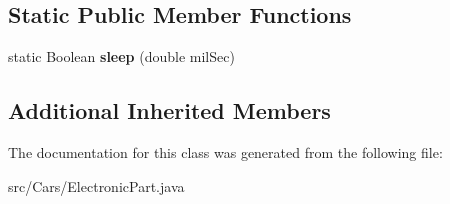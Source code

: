 \subsection*{Static Public Member Functions}
\begin{DoxyCompactItemize}
\item 
\hypertarget{classCars_1_1ElectronicPart_ae1aab39bc1dab4d86505c15f7930aa1b}{}static Boolean {\bfseries sleep} (double mil\+Sec)\label{classCars_1_1ElectronicPart_ae1aab39bc1dab4d86505c15f7930aa1b}

\end{DoxyCompactItemize}
\subsection*{Additional Inherited Members}


The documentation for this class was generated from the following file\+:\begin{DoxyCompactItemize}
\item 
src/\+Cars/Electronic\+Part.\+java\end{DoxyCompactItemize}
